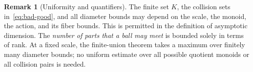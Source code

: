 \documentclass[11pt,letterpaper]{article}
\theoremstyle{definition}
\newtheorem{remark}[theorem]{Remark}
\newcommand{\NN}{\mathbb N}
\begin{document}
\begin{remark}[Uniformity and quantifiers]\label{rem:quantifiers}
The finite set $K$, the collision sets in~\eqref{eq:bad-good}, and all
diameter bounds may depend on the scale, the monoid, the action, and its
fiber bounds. This is permitted in the definition of asymptotic dimension.
The \emph{number of parts that a ball may meet} is bounded solely in terms
of rank. At a fixed scale, the finite-union theorem takes a maximum over
finitely many diameter bounds; no uniform estimate over all possible
quotient monoids or all collision pairs is needed.
\end{remark}










\end{document}
